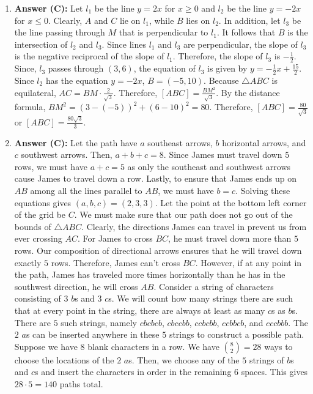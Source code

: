 \documentclass[12pt]{scrartcl}
\begin{document}
\begin{enumerate}
\item \textbf{Answer (C):} Let $l_{1}$ be the line $y=2x$ for $x\ge0$ and $l_{2}$ be the line $y=-2x$ for $x\le0$. Clearly, $A$ and $C$ lie on $l_{1}$, while $B$ lies on $l_{2}$. In addition, let $l_{3}$ be the line passing through $M$ that is perpendicular to $l_{1}$. It follows that $B$ is the intersection of $l_{2}$ and $l_{3}$. Since lines $l_{1}$ and $l_{3}$ are perpendicular, the slope of $l_{3}$ is the negative reciprocal of the slope of $l_{1}$. Therefore, the slope of $l_{3}$ is $-\frac{1}{2}$. Since, $l_{3}$ passes through $(3,6)$, the equation of $l_{3}$ is given by $y=-\frac{1}{2}x+\frac{15}{2}$. Since $l_{2}$ has the equation $y=-2x$, $B=(-5,10)$. Because $\triangle ABC$ is equilateral, $AC=BM\cdot\frac{2}{\sqrt{3}}$. Therefore, $[ABC]=\frac{BM^{2}}{\sqrt{3}}$. By the distance formula, $BM^{2}=(3-(-5))^{2}+(6-10)^{2}=80$. Therefore, $[ABC]=\frac{80}{\sqrt{3}}$ or $[ABC]=\frac{80\sqrt{3}}{3}$.

\item \textbf{Answer (C):} Let the path have $a$ southeast arrows, $b$ horizontal arrows, and $c$ southwest arrows. Then, $a+b+c=8$. Since James must travel down $5$ rows, we must have $a+c=5$ as only the southeast and southwest arrows cause James to travel down a row. Lastly, to ensure that James ends up on $AB$ among all the lines parallel to $AB$, we must have $b=c$. Solving these equations gives $(a,b,c)=(2,3,3)$. Let the point at the bottom left corner of the grid be $C$. We must make sure that our path does not go out of the bounds of $\triangle ABC$. Clearly, the directions James can travel in prevent us from ever crossing $AC$. For James to cross $BC$, he must travel down more than $5$ rows. Our composition of directional arrows ensures that he will travel down exactly $5$ rows. Therefore, James can't cross $BC$. However, if at any point in the path, James has traveled more times horizontally than he has in the southwest direction, he will cross $AB$. Consider a string of characters consisting of $3$ $b$s and $3$ $c$s. We will count how many strings there are such that at every point in the string, there are always at least as many $c$s as $b$s. There are $5$ such strings, namely $cbcbcb$, $cbccbb$, $ccbcbb$, $ccbbcb$, and $cccbbb$. The $2$ $a$s can be inserted anywhere in these $5$ strings to construct a possible path. Suppose we have $8$ blank characters in a row. We have $\binom{8}{2}=28$ ways to choose the locations of the $2$ $a$s. Then, we choose any of the $5$ strings of $b$s and $c$s and insert the characters in order in the remaining $6$ spaces. This gives $28\cdot5=140$ paths total.


\end{enumerate}
\end{document}

